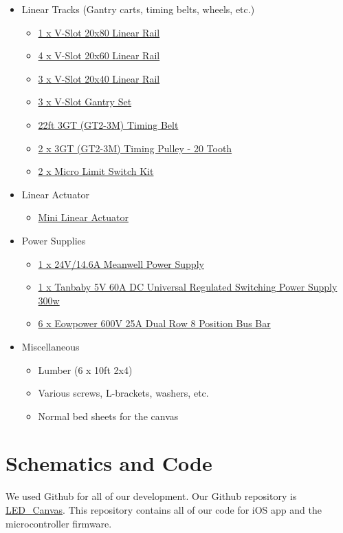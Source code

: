 \documentclass[11pt]{IEEEtran}
\begin{document}
\begin{itemize}
\item Linear Tracks (Gantry carts, timing belts, wheels, etc.)
  \begin{itemize}
  \item \href{https://openbuildspartstore.com/v-slot-20x80-linear-rail/}{1 x V-Slot 20x80 Linear Rail}
  \item \href{https://openbuildspartstore.com/v-slot-20x60-linear-rail/}{4 x V-Slot 20x60 Linear Rail}
  \item \href{https://openbuildspartstore.com/v-slot-20x40-linear-rail/}{3 x V-Slot 20x40 Linear Rail}
  \item \href{https://openbuildspartstore.com/v-slot-gantry-set-universal/}{3 x V-Slot Gantry Set}
  \item \href{https://openbuildspartstore.com/3gt-gt2-3m-timing-belt-by-the-foot/}{22ft 3GT (GT2-3M) Timing Belt}
  \item \href{https://openbuildspartstore.com/3gt-timing-pulley-20-tooth/}{2 x 3GT (GT2-3M) Timing Pulley - 20 Tooth}
  \item \href{https://openbuildspartstore.com/micro-limit-switch-kit/}{2 x Micro Limit Switch Kit}
  \end{itemize}

\item Linear Actuator
  \begin{itemize}
  \item \href{https://openbuildspartstore.com/micro-limit-switch-kit/}{Mini Linear Actuator}
  \end{itemize}

\item Power Supplies
  \begin{itemize}
  \item \href{https://openbuildspartstore.com/24v-14-6a-meanwell-power-supply/}{1 x 24V/14.6A Meanwell Power Supply}
  \item \href{https://www.amazon.com/Tanbaby-Universal-Regulated-Switching-Computer/dp/B017YEOAPA}{1 x Tanbaby 5V 60A DC Universal Regulated Switching Power Supply 300w}
  \item \href{https://www.amazon.com/gp/product/B06XKFCTSM/ref=oh_aui_detailpage_o05_s00?ie=UTF8&psc=1}{6 x Eowpower 600V 25A Dual Row 8 Position Bus Bar } 
  \end{itemize}

\item Miscellaneous
  \begin{itemize}
  \item Lumber (6 x 10ft 2x4)
  \item Various screws, L-brackets, washers, etc.
  \item Normal bed sheets for the canvas
  \end{itemize}
\end{itemize}

\section{Schematics and Code}
We used Github for all of our development. Our Github repository is \href{https://github.com/rajp20/LED_Canvas}{LED\_Canvas}. This repository contains all of our code for iOS app and the microcontroller firmware. 
\end{document}
